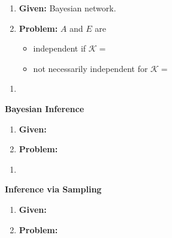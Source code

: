 \begin{example}
    \begin{enumerate}
        \item \textbf{Given:} Bayesian network.
        \item \textbf{Problem:} $A$ and $E$ are 
        \begin{itemize}
            \item independent if $\mathcal{K}=$
            \item not necessarily independent for $\mathcal{K}=$
        \end{itemize}
    \end{enumerate}
\end{example}
\newpage

\begin{process}
    \begin{enumerate}
        \item 
    \end{enumerate}
\end{process}

\begin{example} \textbf{Bayesian Inference}
    \begin{enumerate}
        \item \textbf{Given:}
        \item \textbf{Problem:}
    \end{enumerate}
\end{example}
\newpage

\begin{process}
    \begin{enumerate}
        \item 
    \end{enumerate}
\end{process}

\begin{example} \textbf{Inference via Sampling}
    \begin{enumerate}
        \item \textbf{Given:}
        \item \textbf{Problem:}
    \end{enumerate}
\end{example}

